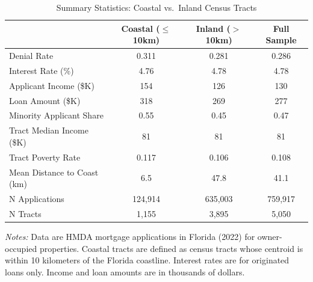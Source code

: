 \begin{table}[htbp]
\centering
\caption{Summary Statistics: Coastal vs.\ Inland Census Tracts}
\label{tab:summary}
\small
\begin{tabular}{lccc}
\hline\hline
 & Coastal ($\leq$10km) & Inland ($>$10km) & Full Sample \\
\hline
Denial Rate & 0.311 & 0.281 & 0.286 \\
Interest Rate (\%) & 4.76 & 4.78 & 4.78 \\
Applicant Income (\$K) & 154 & 126 & 130 \\
Loan Amount (\$K) & 318 & 269 & 277 \\
Minority Applicant Share & 0.55 & 0.45 & 0.47 \\
Tract Median Income (\$K) & 81 & 81 & 81 \\
Tract Poverty Rate & 0.117 & 0.106 & 0.108 \\
Mean Distance to Coast (km) & 6.5 & 47.8 & 41.1 \\
\hline
N Applications & 124,914 & 635,003 & 759,917 \\
N Tracts & 1,155 & 3,895 & 5,050 \\
\hline\hline
\end{tabular}
\begin{tablenotes}[flushleft]\small
\item \textit{Notes:} Data are HMDA mortgage applications in Florida (2022) for owner-occupied properties. Coastal tracts are defined as census tracts whose centroid is within 10 kilometers of the Florida coastline. Interest rates are for originated loans only. Income and loan amounts are in thousands of dollars.
\end{tablenotes}
\end{table}

